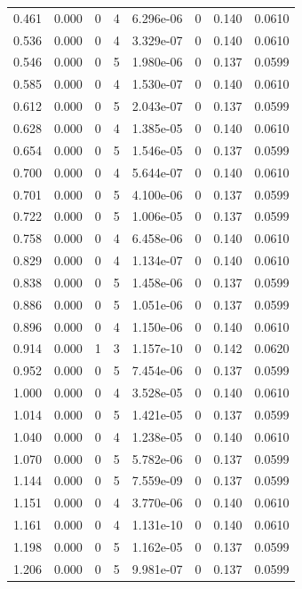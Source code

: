 \documentclass[preview]{standalone}
\begin{document}
{{\begin{tabular}{L{1.2cm}C{1.2cm} C{0.3cm}C{0.5cm} C{1.4cm}C{1.4cm} C{1.4cm}C{1.4cm}}
  0.461  &  0.000  & 0     &  4 &  6.296e-06  & 0  & 0.140 &  0.0610   \\ 
  0.536  &  0.000  & 0     &  4 &  3.329e-07  & 0  & 0.140 &  0.0610   \\ 
  0.546  &  0.000  & 0     &  5 &  1.980e-06  & 0  & 0.137 &  0.0599   \\ 
  0.585  &  0.000  & 0     &  4 &  1.530e-07  & 0  & 0.140 &  0.0610   \\ 
  0.612  &  0.000  & 0     &  5 &  2.043e-07  & 0  & 0.137 &  0.0599   \\ 
  0.628  &  0.000  & 0     &  4 &  1.385e-05  & 0  & 0.140 &  0.0610   \\ 
  0.654  &  0.000  & 0     &  5 &  1.546e-05  & 0  & 0.137 &  0.0599   \\ 
  0.700  &  0.000  & 0     &  4 &  5.644e-07  & 0  & 0.140 &  0.0610   \\ 
  0.701  &  0.000  & 0     &  5 &  4.100e-06  & 0  & 0.137 &  0.0599   \\ 
  0.722  &  0.000  & 0     &  5 &  1.006e-05  & 0  & 0.137 &  0.0599   \\ 
  0.758  &  0.000  & 0     &  4 &  6.458e-06  & 0  & 0.140 &  0.0610   \\ 
  0.829  &  0.000  & 0     &  4 &  1.134e-07  & 0  & 0.140 &  0.0610   \\ 
  0.838  &  0.000  & 0     &  5 &  1.458e-06  & 0  & 0.137 &  0.0599   \\ 
  0.886  &  0.000  & 0     &  5 &  1.051e-06  & 0  & 0.137 &  0.0599   \\ 
  0.896  &  0.000  & 0     &  4 &  1.150e-06  & 0  & 0.140 &  0.0610   \\ 
  0.914  &  0.000  & 1     &  3 &  1.157e-10  & 0  & 0.142 &  0.0620   \\ 
  0.952  &  0.000  & 0     &  5 &  7.454e-06  & 0  & 0.137 &  0.0599   \\ 
  1.000  &  0.000  & 0     &  4 &  3.528e-05  & 0  & 0.140 &  0.0610   \\ 
  1.014  &  0.000  & 0     &  5 &  1.421e-05  & 0  & 0.137 &  0.0599   \\ 
  1.040  &  0.000  & 0     &  4 &  1.238e-05  & 0  & 0.140 &  0.0610   \\ 
  1.070  &  0.000  & 0     &  5 &  5.782e-06  & 0  & 0.137 &  0.0599   \\ 
  1.144  &  0.000  & 0     &  5 &  7.559e-09  & 0  & 0.137 &  0.0599   \\ 
  1.151  &  0.000  & 0     &  4 &  3.770e-06  & 0  & 0.140 &  0.0610   \\ 
  1.161  &  0.000  & 0     &  4 &  1.131e-10  & 0  & 0.140 &  0.0610   \\ 
  1.198  &  0.000  & 0     &  5 &  1.162e-05  & 0  & 0.137 &  0.0599   \\ 
  1.206  &  0.000  & 0     &  5 &  9.981e-07  & 0  & 0.137 &  0.0599   \\ 
\hline 
\end{tabular} 

}}
\end{document}
